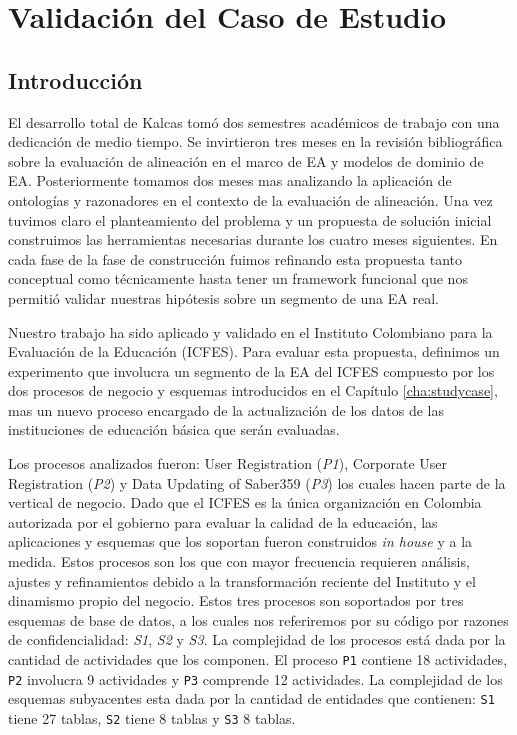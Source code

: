 \chapter{Validaci\'on del Caso de Estudio} \label{cha:evaluation}

\section{Introducci\'on} \label{sec:evalintro}

El desarrollo total de Kalcas tom\'o dos semestres acad\'emicos de trabajo con una dedicaci\'on de medio tiempo. Se invirtieron tres meses en la revisi\'on bibliogr\'afica sobre la evaluaci\'on de alineaci\'on en el marco de EA y modelos de dominio de EA. Posteriormente tomamos dos meses mas analizando la aplicaci\'on de ontolog\'ias y razonadores en el contexto de la evaluaci\'on de alineaci\'on. Una vez tuvimos claro el planteamiento del problema y un propuesta de soluci\'on inicial construimos las herramientas necesarias durante los cuatro meses siguientes. En cada fase de la fase de construcci\'on fuimos refinando esta propuesta tanto conceptual como t\'ecnicamente hasta tener un framework funcional que nos permiti\'o validar nuestras hip\'otesis sobre un segmento de una EA real.  

Nuestro trabajo ha sido aplicado y validado en el Instituto Colombiano para la Evaluaci\'on de la Educaci\'on (ICFES). Para evaluar esta propuesta, definimos un experimento que involucra un segmento de la EA del ICFES compuesto por los dos procesos de negocio y esquemas introducidos en el Cap\'itulo \ref{cha:studycase}, mas un nuevo proceso encargado de la actualizaci\'on de los datos de las instituciones de educaci\'on b\'asica que ser\'an evaluadas.

Los procesos analizados fueron: User Registration (\textit{P1}), Corporate User Registration (\textit{P2}) y Data Updating of Saber359 (\textit{P3}) los cuales hacen parte de la vertical de negocio. Dado que el ICFES es la \'unica organizaci\'on en Colombia autorizada por el gobierno para evaluar la calidad de la educaci\'on, las aplicaciones y esquemas que los soportan fueron construidos \textit{in house} y a la medida. Estos procesos son los que con mayor frecuencia requieren an\'alisis, ajustes y refinamientos debido a la transformaci\'on reciente del Instituto y el dinamismo propio del negocio. Estos tres procesos son soportados por tres esquemas de base de datos, a los cuales nos referiremos por su c\'odigo por razones de confidencialidad: \textit{S1}, \textit{S2} y \textit{S3}. La complejidad de los procesos est\'a dada por la cantidad de actividades que los componen. El proceso \texttt{P1} contiene 18 actividades, \texttt{P2} involucra 9 actividades y \texttt{P3} comprende 12 actividades. La complejidad de los esquemas subyacentes esta dada por la cantidad de entidades que contienen: \texttt{S1} tiene 27 tablas, \texttt{S2} tiene 8 tablas y \texttt{S3} 8 tablas.

